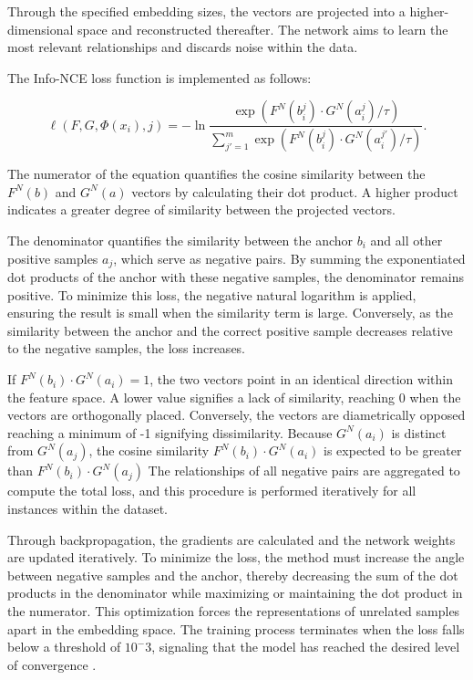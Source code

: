 Through the specified embedding sizes, the vectors are projected into a higher-dimensional space and reconstructed thereafter. 
The network aims to learn the most relevant relationships and discards noise within the data.


The Info-NCE loss function is implemented as follows:

\begin{equation}
   \ell(F, G, \Phi(x_i), j) = -\ln \frac{\exp(F^N(b_i^j) \cdot G^N(a_i^j) / \tau)}{\sum_{j'=1}^{m} \exp(F^N(b_i^j) \cdot G^N(a_i^{j'}) / \tau)}.
   \label{INFONCE}
\end{equation}


The numerator of the equation quantifies the cosine similarity between the $F^N(b)$ and $G^N(a)$ vectors by calculating their dot product. 
A higher product indicates a greater degree of similarity between the projected vectors. 


The denominator quantifies the similarity between the anchor $b_i$ and all other positive samples $a_j$, which serve as negative pairs. 
By summing the exponentiated dot products of the anchor with these negative samples, the denominator remains positive. 
To minimize this loss, the negative natural logarithm is applied, ensuring the result is small when the similarity term is large. 
Conversely, as the similarity between the anchor and the correct positive sample decreases relative to the negative samples, the loss increases.


If $F^N(b_i)\cdot{G^N(a_i)=1}$, the two vectors point in an identical direction within the feature space. 
A lower value signifies a lack of similarity, reaching 0 when the vectors are orthogonally placed.
Conversely, the vectors are diametrically opposed reaching a minimum of -1 signifying dissimilarity.
Because $G^N(a_i)$ is distinct from $G^N(a_j)$, the cosine similarity $F^N(b_i)\cdot{G^N(a_i)}$ is expected to be greater than $F^N(b_i)\cdot{G^N(a_j)}$ 
The relationships of all negative pairs are aggregated to compute the total loss, and this procedure is performed iteratively for all instances within the dataset.


Through backpropagation, the gradients are calculated and the network weights are updated iteratively. 
To minimize the loss, the method must increase the angle between negative samples and the anchor, thereby decreasing the sum of the dot products in the denominator while maximizing or maintaining the dot product in the numerator. 
This optimization forces the representations of unrelated samples apart in the embedding space. 
The training process terminates when the loss falls below a threshold of $10^-3$, signaling that the model has reached the desired level of convergence \citep[p. 5]{shenkar2022anomaly}.


